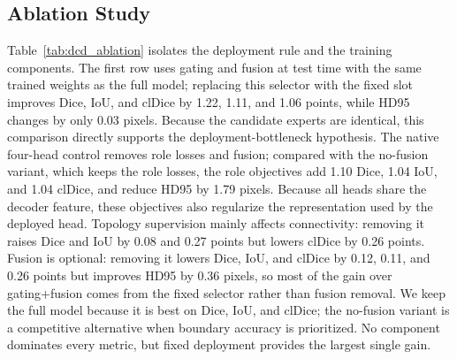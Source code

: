 \subsection{Ablation Study}
\label{sec:ablation}



Table~\ref{tab:dcd_ablation} isolates the deployment rule and the training
components.  The first row uses gating and fusion at test time with the
same trained weights as the full model; replacing this selector with the
fixed slot improves Dice, IoU, and clDice by 1.22, 1.11, and 1.06 points,
while HD95 changes by only 0.03 pixels.  Because the candidate experts are identical,
this comparison directly supports the deployment-bottleneck hypothesis.  The
native four-head control removes role losses and fusion; compared with the
no-fusion variant, which keeps the role losses, the role objectives add 1.10
Dice, 1.04 IoU, and 1.04 clDice, and reduce HD95 by 1.79 pixels.  Because all
heads share the decoder feature, these objectives also regularize the
representation used by the deployed head.  Topology
supervision mainly affects connectivity: removing it raises Dice and IoU by
0.08 and 0.27 points but lowers clDice by 0.26 points.  Fusion is optional:
removing it lowers Dice, IoU, and clDice by 0.12, 0.11, and 0.26 points but
improves HD95 by 0.36 pixels, so most of the gain over gating+fusion comes
from the fixed selector rather than fusion removal.  We keep the full model
because it is best on Dice, IoU, and clDice; the no-fusion variant is a
competitive alternative when boundary accuracy is prioritized.  No component
dominates every metric, but fixed deployment provides the largest single gain.
